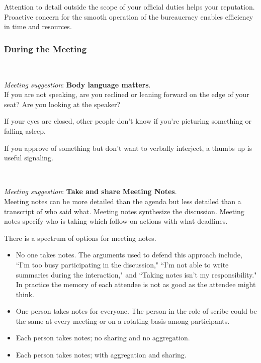 Attention to detail outside the scope of your official duties helps your reputation. Proactive concern for the smooth operation of the bureaucracy enables efficiency in time and resources.



\subsubsection*{During the Meeting}

\ \\
\begin{samepage}
\textit{Meeting suggestion}: \textbf{Body language matters}.\\
If you are not speaking, are you reclined or leaning forward on the edge of your seat? Are you looking at the speaker?
\end{samepage}

If your eyes are closed, other people don't know if you're picturing something or falling asleep. 

If you approve of something but don't want to verbally interject, a thumbs up is useful signaling. 

\ \\
\begin{samepage}
\textit{Meeting suggestion}: \textbf{Take and share Meeting Notes}.\\
Meeting notes can be more detailed than the agenda but less detailed than a transcript of who said what. Meeting notes synthesize the discussion. Meeting notes specify who is taking which follow-on actions with what deadlines. 
\end{samepage}

There is a spectrum of options for meeting notes. 
\begin{itemize}
    \item No one takes notes. The arguments used to defend this approach include, ``I'm too busy participating in the discussion," ``I'm not able to write summaries during the interaction," and ``Taking notes isn't my responsibility." In practice the memory of each attendee is not as good as the attendee might think.
    \item One person takes notes for everyone. The person in the role of scribe could be the same at every meeting or on a rotating basis among participants.
    \item Each person takes notes; no sharing and no aggregation.
    \item Each person takes notes; with aggregation and sharing.
\end{itemize}

